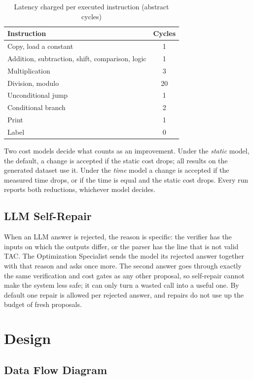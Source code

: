 \documentclass[12pt,a4paper]{report}
\begin{document}
\begin{table}[H]
\centering
\caption{Latency charged per executed instruction (abstract cycles)}
\label{tab:latency}
\begin{tabular}{|l|c|}
\hline
\textbf{Instruction} & \textbf{Cycles} \\
\hline
Copy, load a constant & 1 \\
\hline
Addition, subtraction, shift, comparison, logic & 1 \\
\hline
Multiplication & 3 \\
\hline
Division, modulo & 20 \\
\hline
Unconditional jump & 1 \\
\hline
Conditional branch & 2 \\
\hline
Print & 1 \\
\hline
Label & 0 \\
\hline
\end{tabular}
\end{table}

Two cost models decide what counts as an improvement. Under the \emph{static} model, the default, a change is accepted if the static cost drops; all results on the generated dataset use it. Under the \emph{time} model a change is accepted if the measured time drops, or if the time is equal and the static cost drops. Every run reports both reductions, whichever model decides.

\subsection{LLM Self-Repair}
\label{sec:repair}

When an LLM answer is rejected, the reason is specific: the verifier has the inputs on which the outputs differ, or the parser has the line that is not valid TAC. The Optimization Specialist sends the model its rejected answer together with that reason and asks once more. The second answer goes through exactly the same verification and cost gates as any other proposal, so self-repair cannot make the system less safe; it can only turn a wasted call into a useful one. By default one repair is allowed per rejected answer, and repairs do not use up the budget of fresh proposals.

\section{Design}

\subsection{Data Flow Diagram}
\end{document}
